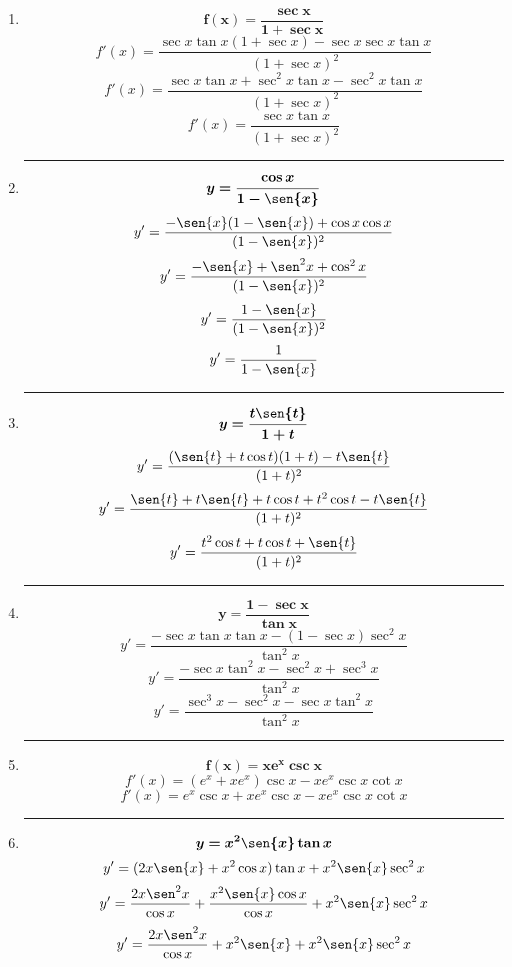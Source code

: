 \documentclass[12pt]{article}
\begin{document}
\begin{enumerate}[label=\textbf{\arabic*)}]
            \hrule\item \[\bm{f(x) = \frac{\sec{x}}{1 + \sec{x}}}\]
                \[f'(x) = \frac{\sec{x}\tan{x}(1 + \sec{x}) - \sec{x}\sec{x}\tan{x}}{(1 + \sec{x})^2}\]
                \[f'(x) = \frac{\sec{x}\tan{x} + \sec^2{x}\tan{x} - \sec^2{x}\tan{x}}{(1 + \sec{x})^2}\]
                \[f'(x) = \frac{\sec{x}\tan{x}}{(1 + \sec{x})^2}\]

            \hrule\item \[\bm{y = \frac{\cos{x}}{1 - \sen{x}}}\]
                \[y' = \frac{-\sen{x}(1 - \sen{x}) + \cos{x}\cos{x}}{(1 - \sen{x})^2}\] 
                \[y' = \frac{-\sen{x} + \sen^2{x} + \cos^2{x}}{(1 - \sen{x})^2}\]
                \[y' = \frac{1 -\sen{x} }{(1 - \sen{x})^2}\] 
                \[y' = \frac{1}{1 - \sen{x}}\]   

            \newpage
            \hrule\item \[\bm{y = \frac{t \sen{t}}{1 + t}}\]
                \[y' = \frac{(\sen{t} + t\cos{t})(1 + t) - t \sen{t}}{(1 + t)^2}\] 
                \[y' = \frac{\sen{t} + t\sen{t} + t\cos{t} + t^2\cos{t} - t\sen{t}}{(1 + t)^2}\] 
                \[y' = \frac{t^2\cos{t} + t\cos{t} + \sen{t}}{(1 + t)^2}\]   

            \hrule\item \[\bm{y = \frac{1 - \sec{x}}{\tan{x}}}\]
                \[y' = \frac{-\sec{x}\tan{x}\tan{x} - (1 - \sec{x})\sec^2{x}}{\tan^2{x}}\]
                \[y' = \frac{-\sec{x}\tan^2{x} - \sec^2{x} + \sec^3{x}}{\tan^2{x}}\]   
                \[y' = \frac{\sec^3{x} - \sec^2{x} -\sec{x}\tan^2{x}}{\tan^2{x}}\]  

            \hrule\item \[\bm{f(x) = xe^x \csc{x}}\]
                \[f'(x) = (e^x + xe^x)\csc{x} - xe^x\csc{x}\cot{x}\] 
                \[f'(x) = e^x\csc{x} + xe^x\csc{x} - xe^x\csc{x}\cot{x}\] 
            
            \hrule\item \[\bm{y = x^2 \sen{x}\tan{x}}\]
                \[y' = (2x\sen{x} + x^2\cos{x})\tan{x} + x^2 \sen{x}\sec^2{x}\] 
                \[y' = \frac{2x\sen^2{x}}{\cos{x}} + \frac{x^2\sen{x}\cos{x}}{\cos{x}} + x^2 \sen{x}\sec^2{x}\] 
                \[y' = \frac{2x\sen^2{x}}{\cos{x}} + x^2\sen{x} + x^2 \sen{x}\sec^2{x}\] 

        \end{enumerate}
\end{document}
